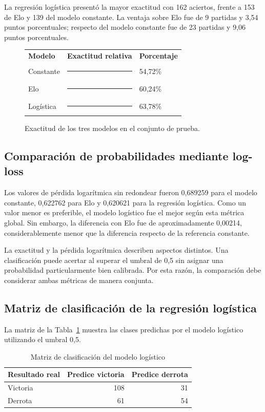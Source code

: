 \documentclass[12pt,a4paper]{article}
\begin{document}
La regresión logística presentó la mayor exactitud con 162 aciertos, frente a 153 de Elo y 139 del modelo constante. La ventaja sobre Elo fue de 9 partidas y 3,54 puntos porcentuales; respecto del modelo constante fue de 23 partidas y 9,06 puntos porcentuales.

\begin{figure}[htbp]
\centering
\begin{tabular}{@{}lcl@{}}
\textbf{Modelo} & \textbf{Exactitud relativa} & \textbf{Porcentaje}\\[0.15cm]
Constante & \rule{5.47cm}{0.25cm} & 54,72\%\\[0.15cm]
Elo & \rule{6.02cm}{0.25cm} & 60,24\%\\[0.15cm]
Logística & \rule{6.38cm}{0.25cm} & 63,78\%
\end{tabular}
\caption{Exactitud de los tres modelos en el conjunto de prueba.}
\label{fig:exactitud}
\end{figure}

\subsection{Comparación de probabilidades mediante log-loss}

Los valores de pérdida logarítmica sin redondear fueron 0,689259 para el modelo constante, 0,622762 para Elo y 0,620621 para la regresión logística. Como un valor menor es preferible, el modelo logístico fue el mejor según esta métrica global. Sin embargo, la diferencia con Elo fue de aproximadamente 0,00214, considerablemente menor que la diferencia respecto de la referencia constante.

La exactitud y la pérdida logarítmica describen aspectos distintos. Una clasificación puede acertar al superar el umbral de 0,5 sin asignar una probabilidad particularmente bien calibrada. Por esta razón, la comparación debe considerar ambas métricas de manera conjunta.

\subsection{Matriz de clasificación de la regresión logística}

La matriz de la Tabla~\ref{tab:confusion} muestra las clases predichas por el modelo logístico utilizando el umbral 0,5.

\begin{table}[htbp]
\centering
\caption{Matriz de clasificación del modelo logístico}
\label{tab:confusion}
\begin{tabular}{lrr}
\toprule
\textbf{Resultado real} & \textbf{Predice victoria} & \textbf{Predice derrota}\\
\midrule
Victoria & 108 & 31\\
Derrota & 61 & 54\\
\bottomrule
\end{tabular}
\end{table}
\end{document}
